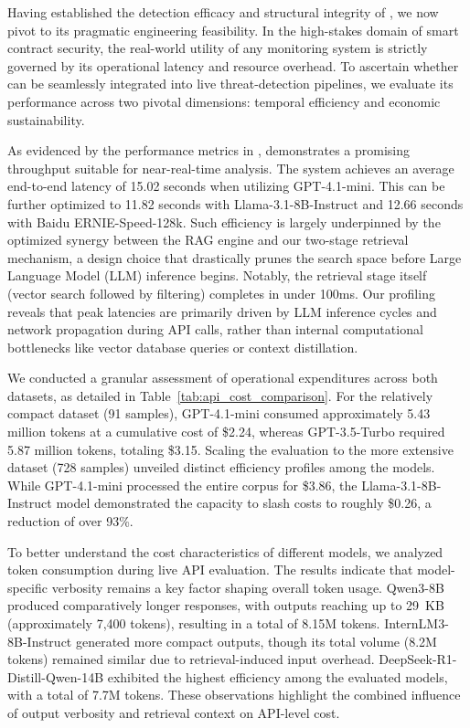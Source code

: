 
Having established the detection efficacy and structural integrity of \approach{}, we now pivot to its pragmatic engineering feasibility. In the high-stakes domain of smart contract security, the real-world utility of any monitoring system is strictly governed by its operational latency and resource overhead. To ascertain whether \approach{} can be seamlessly integrated into live threat-detection pipelines, we evaluate its performance across two pivotal dimensions: temporal efficiency and economic sustainability.

As evidenced by the performance metrics in , \approach{} demonstrates a promising throughput suitable for near-real-time analysis. The system achieves an average end-to-end latency of 15.02 seconds when utilizing GPT-4.1-mini. This can be further optimized to 11.82 seconds with Llama-3.1-8B-Instruct and 12.66 seconds with Baidu ERNIE-Speed-128k. Such efficiency is largely underpinned by the optimized synergy between the RAG engine and our two-stage retrieval mechanism, a design choice that drastically prunes the search space before Large Language Model (LLM) inference begins. Notably, the retrieval stage itself (vector search followed by filtering) completes in under 100ms. Our profiling reveals that peak latencies are primarily driven by LLM inference cycles and network propagation during API calls, rather than internal computational bottlenecks like vector database queries or context distillation.

We conducted a granular assessment of operational expenditures across both datasets, as detailed in Table~\ref{tab:api_cost_comparison}. For the relatively compact \done{} dataset (91 samples), GPT-4.1-mini consumed approximately 5.43 million tokens at a cumulative cost of \$2.24, whereas GPT-3.5-Turbo required 5.87 million tokens, totaling \$3.15. Scaling the evaluation to the more extensive \dsystem{} dataset (728 samples) unveiled distinct efficiency profiles among the models. While GPT-4.1-mini processed the entire corpus for \$3.86, the Llama-3.1-8B-Instruct model demonstrated the capacity to slash costs to roughly \$0.26, a reduction of over 93\%.

To better understand the cost characteristics of different models, we analyzed token consumption during live API evaluation. The results indicate that model-specific verbosity remains a key factor shaping overall token usage. Qwen3-8B produced comparatively longer responses, with outputs reaching up to 29~KB (approximately 7,400 tokens), resulting in a total of 8.15M tokens. InternLM3-8B-Instruct generated more compact outputs, though its total volume (8.2M tokens) remained similar due to retrieval-induced input overhead. DeepSeek-R1-Distill-Qwen-14B exhibited the highest efficiency among the evaluated models, with a total of 7.7M tokens. These observations highlight the combined influence of output verbosity and retrieval context on API-level cost.


